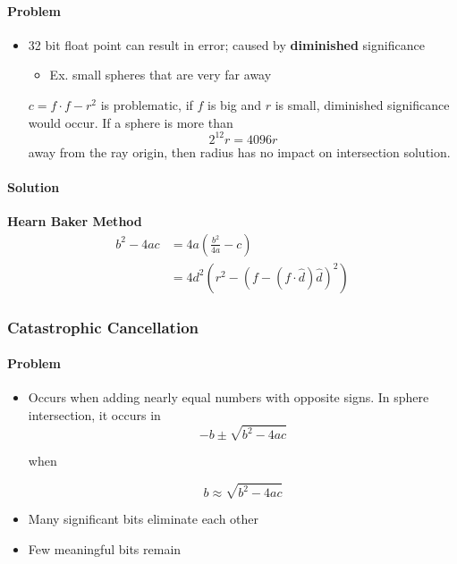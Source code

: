       \paragraph{Problem}
      \begin{itemize}
        \item 32 bit float point can result in error; caused by
        \textbf{diminished} significance
        \begin{itemize}
          \item Ex. small spheres that are very far away
        \end{itemize}

        $ c = f \cdot f - r^{2}  $ is problematic, if $ f $ is big and $ r $ is
        small, diminished significance would occur. If a sphere is more than
        \begin{equation}
          2^{12} r = 4096 r
        \end{equation}
        away from the ray origin, then radius has no impact on intersection
        solution.
      \end{itemize}

      \paragraph{Solution} \textbf{Hearn Baker Method}
      \begin{align}
        b^{2} - 4ac &= 4a \left( \frac{b^{2}}{4a} - c \right) \\
        &= 4d^{2} \left( r^{2} - \left( f - \left( f \cdot \hat{d} \right) \hat{d} \right)^{2} \right)
      \end{align}

    \subsubsection{Catastrophic Cancellation}

      \paragraph{Problem}
      \begin{itemize}
        \item Occurs when adding nearly equal numbers with opposite signs.
        In sphere intersection, it occurs in
        \begin{equation*}
          -b \pm \sqrt{b^{2} - 4ac}
        \end{equation*}

        when

        \begin{equation*}
          b \approx \sqrt{b^{2} - 4ac}
        \end{equation*}

        \item Many significant bits eliminate each other
        \item Few meaningful bits remain
      \end{itemize}

